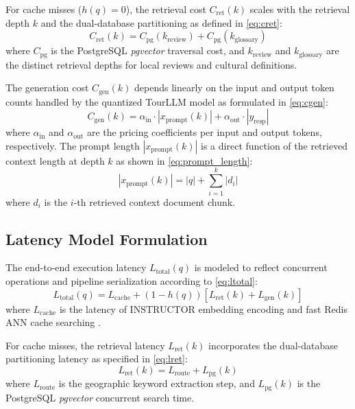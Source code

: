 \documentclass{ieeeaccess}
\begin{document}
For cache misses ($h(q) = 0$), the retrieval cost $C_{\text{ret}}(k)$ scales with the retrieval depth $k$ and the dual-database partitioning as defined in \eqref{eq:cret}:
\begin{equation}
\label{eq:cret}
    C_{\text{ret}}(k) = C_{\text{pg}}(k_{\text{review}}) + C_{\text{pg}}(k_{\text{glossary}})
\end{equation}
where $C_{\text{pg}}$ is the PostgreSQL \emph{pgvector} traversal cost, and $k_{\text{review}}$ and $k_{\text{glossary}}$ are the distinct retrieval depths for local reviews and cultural definitions.

The generation cost $C_{\text{gen}}(k)$ depends linearly on the input and output token counts handled by the quantized TourLLM model \cite{tourllm-2024, dettmers-qlora-2024, hashemi-cost-aware-2025} as formulated in \eqref{eq:cgen}:
\begin{equation}
\label{eq:cgen}
    C_{\text{gen}}(k) = \alpha_{\text{in}} \cdot |x_{\text{prompt}}(k)| + \alpha_{\text{out}} \cdot |y_{\text{resp}}|
\end{equation}
where $\alpha_{\text{in}}$ and $\alpha_{\text{out}}$ are the pricing coefficients per input and output tokens, respectively. The prompt length $|x_{\text{prompt}}(k)|$ is a direct function of the retrieved context length at depth $k$ as shown in \eqref{eq:prompt_length}:
\begin{equation}
\label{eq:prompt_length}
    |x_{\text{prompt}}(k)| = |q| + \sum_{i=1}^{k} |d_i|
\end{equation}
where $d_i$ is the $i$-th retrieved context document chunk.

\subsection{Latency Model Formulation}
The end-to-end execution latency $L_{\text{total}}(q)$ is modeled to reflect concurrent operations and pipeline serialization according to \eqref{eq:ltotal}:
\begin{equation}
\label{eq:ltotal}
    L_{\text{total}}(q) = L_{\text{cache}} + (1 - h(q)) \left[ L_{\text{ret}}(k) + L_{\text{gen}}(k) \right]
\end{equation}
where $L_{\text{cache}}$ is the latency of INSTRUCTOR embedding encoding and fast Redis ANN cache searching \cite{reimers-sbert-2019}. 

For cache misses, the retrieval latency $L_{\text{ret}}(k)$ incorporates the dual-database partitioning latency as specified in \eqref{eq:lret}:
\begin{equation}
\label{eq:lret}
    L_{\text{ret}}(k) = L_{\text{route}} + L_{\text{pg}}(k)
\end{equation}
where $L_{\text{route}}$ is the geographic keyword extraction step, and $L_{\text{pg}}(k)$ is the PostgreSQL \emph{pgvector} concurrent search time.
\end{document}
